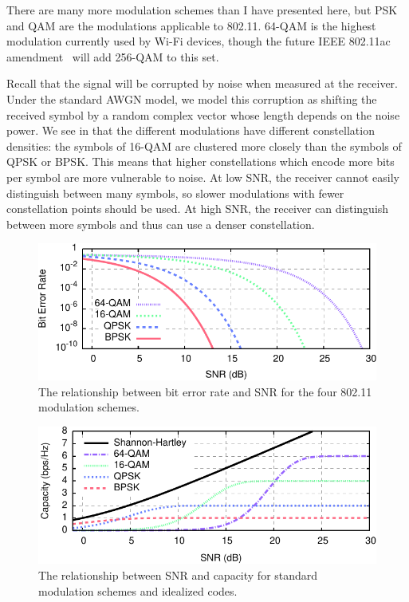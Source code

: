 There are many more modulation schemes than I have presented here, but PSK and QAM are the modulations applicable to 802.11.
64-QAM is the highest modulation currently used by Wi-Fi devices, though the future IEEE 802.11ac amendment~\cite{80211ac} will add 256-QAM to this set.

Recall that the signal will be corrupted by noise when measured at the receiver. Under the standard AWGN model, we model this corruption as shifting the received symbol by a random complex vector whose length depends on the noise power. We see in  that the different modulations have different constellation densities: the symbols of 16-QAM are clustered more closely than the symbols of QPSK or BPSK. This means that higher constellations which encode more bits per symbol are more vulnerable to noise. At low SNR, the receiver cannot easily distinguish between many symbols, so slower modulations with fewer constellation points should be used. At high SNR, the receiver can distinguish between more symbols and thus can use a denser constellation.

\begin{figure}[t]
\centering
\includegraphics{calculations/snr_ber}
\caption[BER vs SNR for the four 802.11n modulation schemes]{\label{fig:mod_ber_snr}The relationship between bit error rate and SNR for the four 802.11 modulation schemes.}
\end{figure}

\begin{figure}[t]
\centering
\includegraphics{calculations/snr_bits}
\caption[Capacity vs SNR for 802.11n modulation and coding schemes]{\label{fig:mod_bits_snr}The relationship between SNR and capacity for standard modulation schemes and idealized codes.}
\end{figure}

